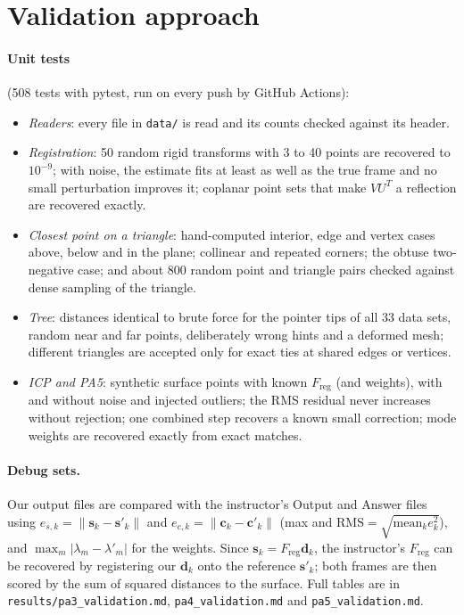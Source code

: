 \documentclass[10pt]{article}
\newcommand{\vect}[1]{\mathbf{#1}}
\newcommand{\F}{F_{\mathrm{reg}}}
\begin{document}
\section{Validation approach}

\paragraph{Unit tests} (508 tests with pytest, run on every push by GitHub Actions):
\begin{itemize}
\item \emph{Readers}: every file in \texttt{data/} is read and its counts checked against its header.
\item \emph{Registration}: 50 random rigid transforms with 3 to 40 points are recovered to $10^{-9}$; with noise, the estimate fits at least as well as the true frame and no small perturbation improves it; coplanar point sets that make $VU^T$ a reflection are recovered exactly.
\item \emph{Closest point on a triangle}: hand-computed interior, edge and vertex cases above, below and in the plane; collinear and repeated corners; the obtuse two-negative case; and about 800 random point and triangle pairs checked against dense sampling of the triangle.
\item \emph{Tree}: distances identical to brute force for the pointer tips of all 33 data sets, random near and far points, deliberately wrong hints and a deformed mesh; different triangles are accepted only for exact ties at shared edges or vertices.
\item \emph{ICP and PA5}: synthetic surface points with known $\F$ (and weights), with and without noise and injected outliers; the RMS residual never increases without rejection; one combined step recovers a known small correction; mode weights are recovered exactly from exact matches.
\end{itemize}

\paragraph{Debug sets.} Our output files are compared with the instructor's Output and Answer files using $e_{s,k}=\|\vect s_k-\vect s'_k\|$ and $e_{c,k}=\|\vect c_k-\vect c'_k\|$ (max and $\mathrm{RMS}=\sqrt{\mathrm{mean}_k e_k^2}$), and $\max_m|\lambda_m-\lambda'_m|$ for the weights. Since $\vect s_k=\F\vect d_k$, the instructor's $\F$ can be recovered by registering our $\vect d_k$ onto the reference $\vect s'_k$; both frames are then scored by the sum of squared distances to the surface. Full tables are in \texttt{results/pa3\_validation.md}, \texttt{pa4\_validation.md} and \texttt{pa5\_validation.md}.
\end{document}
